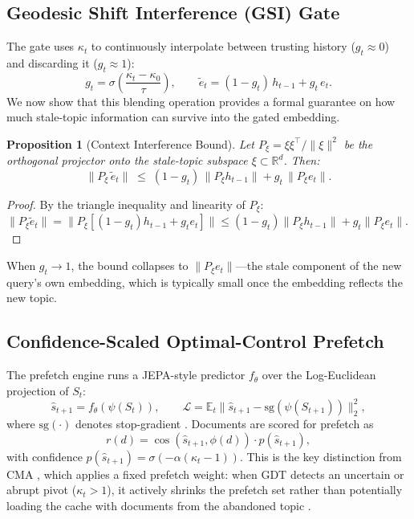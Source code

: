 \documentclass[review]{elsarticle}
\newtheorem{proposition}{Proposition}
\begin{document}
\subsection{Geodesic Shift Interference (GSI) Gate}

The gate uses $\kappa_t$ to continuously interpolate between trusting history
($g_t \approx 0$) and discarding it ($g_t \approx 1$):
\begin{equation}
  g_t = \sigma\!\left(\frac{\kappa_t - \kappa_0}{\tau}\right), \qquad
  \tilde{e}_t = (1-g_t)\,h_{t-1} + g_t\,e_t.
  \label{eq:gate}
\end{equation}
We now show that this blending operation provides a formal guarantee on how much
stale-topic information can survive into the gated embedding.

\begin{proposition}[Context Interference Bound]
\label{prop:interference_bound}
Let $P_\xi = \xi\xi^\top/\|\xi\|^2$ be the orthogonal projector onto the
stale-topic subspace $\xi \subset \mathbb{R}^d$. Then:
\begin{equation}
  \|P_\xi\,\tilde{e}_t\| \;\leq\; (1-g_t)\,\|P_\xi h_{t-1}\| + g_t\,\|P_\xi e_t\|.
  \label{eq:bound}
\end{equation}
\end{proposition}
\begin{proof}
By the triangle inequality and linearity of $P_\xi$:
$\|P_\xi\tilde{e}_t\| = \|P_\xi[(1{-}g_t)h_{t-1}{+}g_t e_t]\|
  \leq (1{-}g_t)\|P_\xi h_{t-1}\| + g_t\|P_\xi e_t\|.$
\end{proof}

When $g_t \to 1$, the bound collapses to $\|P_\xi e_t\|$---the stale component of
the new query's own embedding, which is typically small once the embedding reflects
the new topic.

\subsection{Confidence-Scaled Optimal-Control Prefetch}

The prefetch engine runs a JEPA-style predictor $f_\theta$
\cite{assran2023_ijepa} over the Log-Euclidean projection of $S_t$:
\begin{equation}
  \hat{s}_{t+1} = f_\theta(\psi(S_t)), \qquad
  \mathcal{L} = \mathbb{E}_t\|\hat{s}_{t+1} - \mathrm{sg}(\psi(S_{t+1}))\|_2^2,
  \label{eq:jepa}
\end{equation}
where $\mathrm{sg}(\cdot)$ denotes stop-gradient \cite{grill20}. Documents are
scored for prefetch as
\begin{equation}
  r(d) = \cos(\hat{s}_{t+1}, \phi(d)) \cdot p(\hat{s}_{t+1}),
  \label{eq:prefetch}
\end{equation}
with confidence $p(\hat{s}_{t+1}) = \sigma(-\alpha(\kappa_t{-}1))$. This is the
key distinction from CMA \cite{cma2026,cma2026_clinical}, which applies a fixed
prefetch weight: when GDT detects an uncertain or abrupt pivot ($\kappa_t > 1$),
it actively shrinks the prefetch set rather than potentially loading the cache with
documents from the abandoned topic \cite{sweller1988_cogl}.
\end{document}
